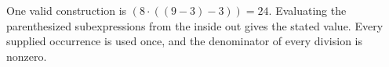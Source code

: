One valid construction is $\boxed{(8\cdot ((9-3)-3))=24}$. Evaluating the parenthesized subexpressions from the inside out gives the stated value. Every supplied occurrence is used once, and the denominator of every division is nonzero.
